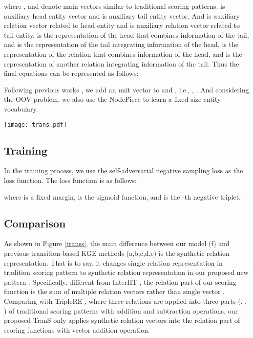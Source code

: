\documentclass[11pt]{article}
\begin{document}
where ,  and  denote main vectors similar to traditional scoring patterns.
 is auxiliary head entity vector and  is auxiliary tail entity vector.
And  is auxiliary relation vector related to head entity and  is auxiliary relation vector related to tail entity.
 is the representation of the head that combines information of the tail, and  is the representation of the tail integrating information of the head. 
  is the representation of the relation that combines information of the head, and   is the representation of another relation integrating information of the tail. 
Thus the final equations can be represented as follows:


Following previous works \cite{long2021triplere,wang2022interht}, we add an unit vector  to  and , i.e., , . And considering the OOV problem, we also use the NodePiece \cite{galkin2021nodepiece} to learn a fixed-size entity vocabulary.

\begin{figure*}[t]
\begin{center}
\texttt{[image: trans.pdf]}
\caption{Comparison of different  transition-based KGE models.
}\label{transs}
\end{center}
\end{figure*}

\subsection{Training}
In the training process, we use the self-adversarial negative sampling loss \cite{sun2019rotate} as the loss function. The loss function is as follows:

where  is a fixed margin,  is the sigmoid function, and  is the -th negative triplet.

\subsection{Comparison}
As shown in Figure \ref{transs}, the main difference between our model (f) and previous transition-based KGE methods (a,b,c,d,e) is the synthetic relation representation.
That is to say, it changes single relation representation  in tradition scoring pattern  to synthetic relation representation  in our proposed new pattern  .
Specifically,
different from InterHT \cite{wang2022interht}, the relation part of our scoring function is the sum of multiple relation vectors  rather than single vector .
Comparing with TripleRE \cite{long2021triplere}, where three relations are applied into three parts  (,  , ) of traditional scoring patterns with addition and subtraction operations, our proposed TranS only applies synthetic relation vectors into the relation part  of scoring functions with vector addition operation.
\end{document}
